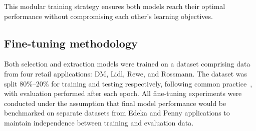 \documentclass[licencjacka,en]{pracamgr}
\begin{document}
This modular training strategy ensures both models reach their optimal performance without compromising each other's learning objectives.
\subsection{Fine-tuning methodology}\label{FTMethodologyBert}
Both selection and extraction models were trained on a dataset comprising data from four retail applications: DM, Lidl, Rewe, and Rossmann. The dataset was split 80\%--20\% for training and testing respectively, following common practice~\cite{pp}, with evaluation performed after each epoch. All fine-tuning experiments were conducted under the assumption that final model performance would be benchmarked on separate datasets from Edeka and Penny applications to maintain independence between training and evaluation data.
\end{document}
